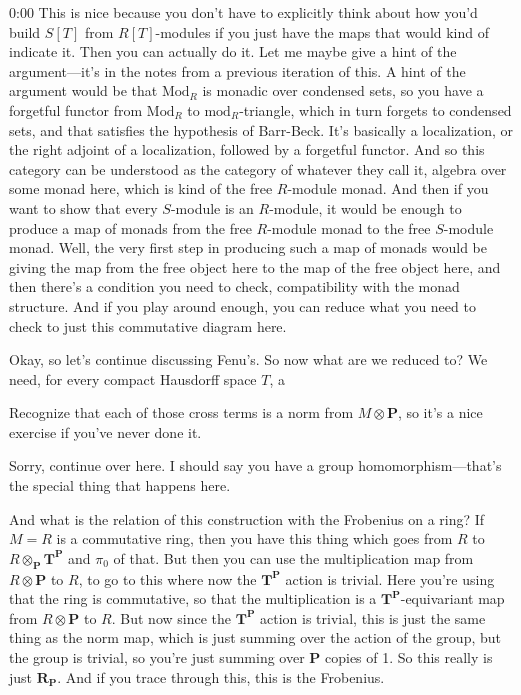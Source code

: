 \begin{unfinished}{0:00}
This is nice because you don't have to explicitly think about how you'd build $S[T]$ from $R[T]$-modules if you just have the maps that would kind of indicate it. Then you can actually do it. Let me maybe give a hint of the argument---it's in the notes from a previous iteration of this. A hint of the argument would be that $\text{Mod}_R$ is monadic over condensed sets, so you have a forgetful functor from $\text{Mod}_R$ to $\text{mod}_R$-triangle, which in turn forgets to condensed sets, and that satisfies the hypothesis of Barr-Beck. It's basically a localization, or the right adjoint of a localization, followed by a forgetful functor. And so this category can be understood as the category of whatever they call it, algebra over some monad here, which is kind of the free $R$-module monad. And then if you want to show that every $S$-module is an $R$-module, it would be enough to produce a map of monads from the free $R$-module monad to the free $S$-module monad. Well, the very first step in producing such a map of monads would be giving the map from the free object here to the map of the free object here, and then there's a condition you need to check, compatibility with the monad structure. And if you play around enough, you can reduce what you need to check to just this commutative diagram here.

Okay, so let's continue discussing Fenu's. So now what are we reduced to? We need, for every compact Hausdorff space $T$, a

Recognize that each of those cross terms is a norm from $M \otimes \mathbf{P}$, so it's a nice exercise if you've never done it.

Sorry, continue over here. I should say you have a group homomorphism---that's the special thing that happens here.

And what is the relation of this construction with the Frobenius on a ring? If $M = R$ is a commutative ring, then you have this thing which goes from $R$ to $R \otimes_\mathbf{P} \mathbf{T}^\mathbf{P}$ and $\pi_0$ of that. But then you can use the multiplication map from $R \otimes \mathbf{P}$ to $R$, to go to this where now the $\mathbf{T}^\mathbf{P}$ action is trivial. Here you're using that the ring is commutative, so that the multiplication is a $\mathbf{T}^\mathbf{P}$-equivariant map from $R \otimes \mathbf{P}$ to $R$. But now since the $\mathbf{T}^\mathbf{P}$ action is trivial, this is just the same thing as the norm map, which is just summing over the action of the group, but the group is trivial, so you're just summing over $\mathbf{P}$ copies of 1. So this really is just $\mathbf{R}_\mathbf{P}$. And if you trace through this, this is the Frobenius.


\end{unfinished}
